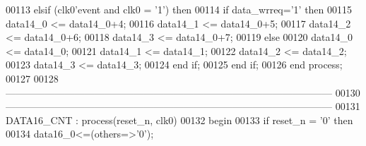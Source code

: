\begin{DoxyCode}
00113       \textcolor{keywordflow}{elsif} \textcolor{vhdlchar}{(}\textcolor{vhdlchar}{clk0}\textcolor{vhdlchar}{'}\textcolor{vhdlkeyword}{event} \textcolor{keywordflow}{and} \textcolor{vhdlchar}{clk0} \textcolor{vhdlchar}{=} \textcolor{vhdlchar}{'}\textcolor{vhdllogic}{}\textcolor{vhdllogic}{1}\textcolor{vhdlchar}{'}\textcolor{vhdlchar}{)} \textcolor{keywordflow}{then}
00114          \textcolor{keywordflow}{if} \textcolor{vhdlchar}{data_wrreq}\textcolor{vhdlchar}{=}\textcolor{vhdlchar}{'}\textcolor{vhdllogic}{}\textcolor{vhdllogic}{1}\textcolor{vhdlchar}{'} \textcolor{keywordflow}{then}   
00115             \textcolor{vhdlchar}{data14_0} \textcolor{vhdlchar}{<=} \textcolor{vhdlchar}{data14_0}\textcolor{vhdlchar}{+}\textcolor{vhdllogic}{}\textcolor{vhdllogic}{4};
00116             \textcolor{vhdlchar}{data14_1} \textcolor{vhdlchar}{<=} \textcolor{vhdlchar}{data14_0}\textcolor{vhdlchar}{+}\textcolor{vhdllogic}{}\textcolor{vhdllogic}{5};
00117             \textcolor{vhdlchar}{data14_2} \textcolor{vhdlchar}{<=} \textcolor{vhdlchar}{data14_0}\textcolor{vhdlchar}{+}\textcolor{vhdllogic}{}\textcolor{vhdllogic}{6};
00118             \textcolor{vhdlchar}{data14_3} \textcolor{vhdlchar}{<=} \textcolor{vhdlchar}{data14_0}\textcolor{vhdlchar}{+}\textcolor{vhdllogic}{}\textcolor{vhdllogic}{7}; 
00119          \textcolor{keywordflow}{else} 
00120             \textcolor{vhdlchar}{data14_0} \textcolor{vhdlchar}{<=} \textcolor{vhdlchar}{data14_0};
00121             \textcolor{vhdlchar}{data14_1} \textcolor{vhdlchar}{<=} \textcolor{vhdlchar}{data14_1};
00122             \textcolor{vhdlchar}{data14_2} \textcolor{vhdlchar}{<=} \textcolor{vhdlchar}{data14_2};
00123             \textcolor{vhdlchar}{data14_3} \textcolor{vhdlchar}{<=} \textcolor{vhdlchar}{data14_3}; 
00124          \textcolor{keywordflow}{end} \textcolor{keywordflow}{if};
00125       \textcolor{keywordflow}{end} \textcolor{keywordflow}{if};
00126    \textcolor{keywordflow}{end} \textcolor{keywordflow}{process};
00127    
00128 \textcolor{keyword}{   ---------------------------------------------------------------------------------------------------}
00130 \textcolor{keyword}{   ---------------------------------------------------------------------------------------------------}
00131    DATA16\_CNT : \textcolor{keywordflow}{process}(reset_n, clk0)
00132 \textcolor{vhdlkeyword}{   begin}
00133       \textcolor{keywordflow}{if} \textcolor{vhdlchar}{reset_n} \textcolor{vhdlchar}{=} \textcolor{vhdlchar}{'}\textcolor{vhdllogic}{}\textcolor{vhdllogic}{0}\textcolor{vhdlchar}{'} \textcolor{keywordflow}{then} 
00134          \textcolor{vhdlchar}{data16_0}\textcolor{vhdlchar}{<=}\textcolor{vhdlchar}{(}\textcolor{keywordflow}{others}\textcolor{vhdlchar}{=}\textcolor{vhdlchar}{>}\textcolor{vhdlchar}{'}\textcolor{vhdllogic}{}\textcolor{vhdllogic}{0}\textcolor{vhdlchar}{'}\textcolor{vhdlchar}{)};

\end{DoxyCode}
